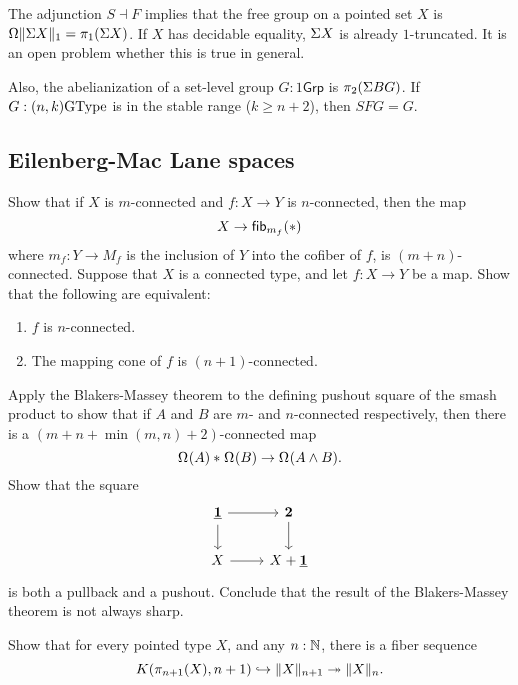 The adjunction ${S} \dashv {F}$ implies that the free group on a
pointed set $X$ is $\loopspacesym\trunc{1}{\susp X}=\pi_1(\susp X)$.  If $X$
has decidable equality, $\susp X$ is already $1$-truncated. It is an
open problem whether this is true in general.

Also, the abelianization of a set-level group $G : 1\mathsf{Grp}$ is
$\pi_2(\susp BG)$. If $G : (n,k)\GType$ is in the stable range ($k \ge
n+2$), then $SFG=G$.

\subsection{Eilenberg-Mac Lane spaces}

\begin{exercises}
\exercise Show that if $X$ is $m$-connected and $f:X\to Y$ is $n$-connected, then the map
\begin{equation*}
X \to \fib{m_f}{\ast}
\end{equation*}
where $m_f:Y\to M_f$ is the inclusion of $Y$ into the cofiber of $f$, is $(m+n)$-connected.
\exercise Suppose that $X$ is a connected type, and let $f:X\to Y$ be a map.
Show that the following are equivalent:
\begin{enumerate}
\item $f$ is $n$-connected.
\item The mapping cone of $f$ is $(n+1)$-connected.
\end{enumerate}
\exercise Apply the Blakers-Massey theorem to the defining pushout square of the smash product to show that if $A$ and $B$ are $m$- and $n$-connected respectively, then there is a $(m+n+\min(m,n)+2)$-connected map
\begin{equation*}
\join{\loopspace{A}}{\loopspace{B}}\to \loopspace{A \wedge B}.
\end{equation*}
\exercise Show that the square
\begin{equation*}
\begin{tikzcd}
\unit \arrow[r] \arrow[d] & \bool \arrow[d] \\
X \arrow[r] & X+\unit
\end{tikzcd}
\end{equation*}
is both a pullback and a pushout. Conclude that the result of the Blakers-Massey theorem is not always sharp.
\item Show that for every pointed type $X$, and any $n:\N$, there is a fiber sequence
  \begin{equation*}
    K(\pi_{n+1}(X),n+1)\hookrightarrow \trunc{n+1}{X}\twoheadrightarrow \trunc{n}{X}.
  \end{equation*}
\end{exercises}
